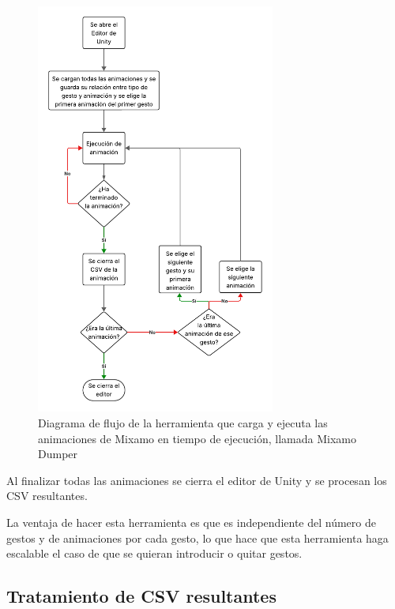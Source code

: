\begin{figure}[H]
    \centering
    \includegraphics[width=0.7\textwidth]{Imagenes/Vectorial/FlujoMixamoDumper.pdf}
    \caption{Diagrama de flujo de la herramienta que carga y ejecuta las animaciones de Mixamo en tiempo de ejecución, llamada Mixamo Dumper}
    \label{fig:MixamoDumper}
\end{figure}

Al finalizar todas las animaciones se cierra el editor de Unity y se procesan los CSV resultantes.

La ventaja de hacer esta herramienta es que es independiente del número de gestos y de animaciones por cada gesto, lo que hace que esta herramienta haga escalable el caso de que se quieran introducir o quitar gestos.

\subsection{Tratamiento de CSV resultantes}

